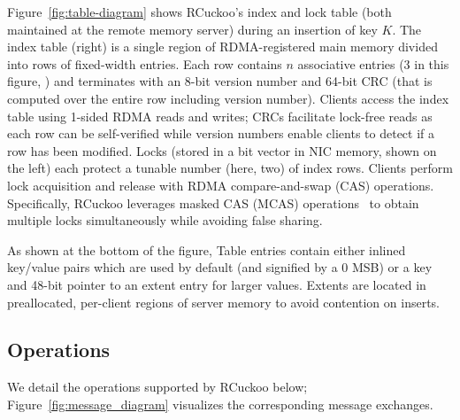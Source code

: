 Figure~\ref{fig:table-diagram} shows RCuckoo's index and lock table
(both maintained at the remote memory server) during an insertion of
key $K$.  The index table (right) is a single region of
RDMA-registered main memory divided into rows of fixed-width entries.
Each row contains $n$ associative entries (3 in this figure, ) and
terminates with an 8-bit version number and 64-bit CRC (that is
computed over the entire row including version number).  Clients
access the index table using 1-sided RDMA reads and writes; CRCs
facilitate lock-free reads as each row can be self-verified while
version numbers enable clients to detect if a row has been modified.
Locks (stored in a bit vector in NIC memory, shown on the left) each
protect a tunable number (here, two) of index rows.  Clients perform
lock acquisition and release with RDMA compare-and-swap (CAS)
operations.  Specifically, RCuckoo leverages masked CAS (MCAS)
operations~\cite{rdma-masked-cas,sherman} to obtain multiple locks
simultaneously while avoiding false sharing.


As shown at the bottom of the figure, Table entries contain either
inlined key/value pairs which are used by default (and signified by a 0 MSB) or a key and 48-bit
pointer to an extent entry for larger values.  
Extents are located in preallocated, per-client regions of server
memory to avoid contention on inserts.





\subsection{Operations}

We detail the operations supported by RCuckoo below;
Figure~\ref{fig:message_diagram} visualizes the corresponding message
exchanges. 

